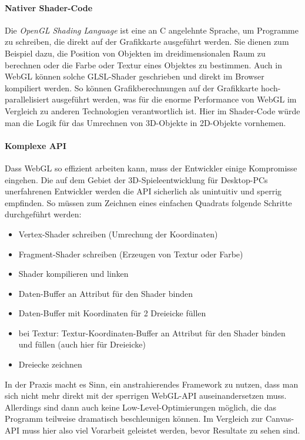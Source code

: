 \documentclass[a4paper, 12pt]{article}
\begin{document}
\paragraph{Nativer Shader-Code} Die \emph{OpenGL Shading Language} ist eine an C angelehnte Sprache, um Programme zu schreiben, die direkt auf der Grafikkarte ausgeführt werden. Sie dienen zum Beispiel dazu, die Position von Objekten im dreidimensionalen Raum zu berechnen oder die Farbe oder Textur eines Objektes zu bestimmen. Auch in WebGL können solche GLSL-Shader geschrieben und direkt im Browser kompiliert werden. So können Grafikberechnungen auf der Grafikkarte hoch-parallelisiert ausgeführt werden, was für die enorme Performance von WebGL im Vergleich zu anderen Technologien verantwortlich ist. Hier im Shader-Code würde man die Logik für das Umrechnen von 3D-Objekte in 2D-Objekte vornhemen.
\paragraph{Komplexe API} Dass WebGL so effizient arbeiten kann, muss der Entwickler einige Kompromisse eingehen. Die auf dem Gebiet der 3D-Spieleentwicklung für Desktop-PCs unerfahrenen Entwickler werden die API sicherlich als unintuitiv und sperrig empfinden. So müssen zum Zeichnen eines einfachen Quadrats folgende Schritte durchgeführt werden:
\begin{itemize}
	\item Vertex-Shader schreiben (Umrechung der Koordinaten)
	\item Fragment-Shader schreiben (Erzeugen von Textur oder Farbe)
	\item Shader kompilieren und linken
	\item Daten-Buffer an Attribut für den Shader binden
	\item Daten-Buffer mit Koordinaten für 2 Dreieicke füllen
	\item bei Textur: Textur-Koordinaten-Buffer an Attribut für den Shader binden und füllen (auch hier für Dreieicke)
	\item Dreiecke zeichnen
\end{itemize}
In der Praxis macht es Sinn, ein anstrahierendes Framework zu nutzen, dass man sich nicht mehr direkt mit der sperrigen WebGL-API auseinandersetzen muss. Allerdings sind dann auch keine Low-Level-Optimierungen möglich, die das Programm teilweise dramatisch beschleunigen können.
Im Vergleich zur Canvas-API muss hier also viel Vorarbeit geleistet werden, bevor Resultate zu sehen sind.
\end{document}
